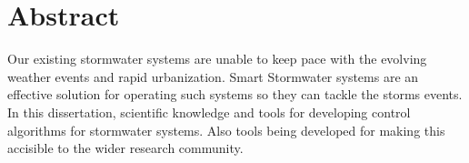 \begingroup
\let\clearpage\relax
\let\cleardoublepage\relax
\let\cleardoublepage\relax

\chapter*{Abstract}
Our existing stormwater systems are unable to keep pace with the evolving weather events and rapid urbanization. 
Smart Stormwater systems are an effective solution for operating such systems so they can tackle the storms events.
In this dissertation, scientific knowledge and tools for developing control algorithms for stormwater systems. 
Also tools being developed for making this accisible to the wider research community.

\endgroup

\vfill
